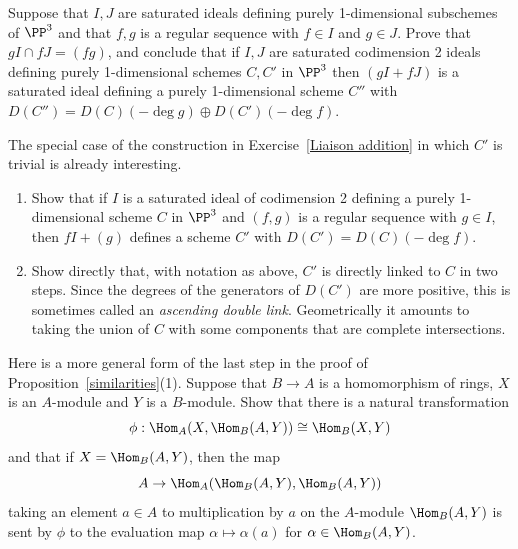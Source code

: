 \begin{exercise}
\label{Liaison addition}
Suppose that $I, J$ are saturated ideals defining purely 1-dimensional
%
subschemes of $\PP^3$
and that $f,g$ is a regular sequence with $f\in I$ and $g\in J$.
Prove that $g I \cap fJ = (fg)$, and conclude that if $I,J$ are saturated
codimension 2 ideals
defining purely 1-dimensional schemes $C,C'$ in $\PP^3$
then $(gI+fJ)$ is a saturated ideal defining a purely 1-dimensional
scheme $C''$ with $D(C'') = D(C)(-\!\deg g) \oplus D(C')(-\!\deg f)$.
\end{exercise}

\begin{exercise}\label{Basic double links}
The special case of the construction in Exercise~\ref{Liaison addition}
%
in which $C'$ is trivial is already interesting.

\begin{enumerate}
\item Show that if $I$ is a 
saturated ideal of codimension 2
%
defining a purely 1-dimensional scheme $C$ in $\PP^3$
and $(f, g)$ is a regular sequence with $g\in I$,
then $fI+(g)$ defines a scheme $C'$ with $D(C') = D(C)(-\!\deg f)$.

\item Show directly that, with notation as above, $C'$ is directly
linked to $C$
in two steps. Since the degrees of the generators of $D(C')$ are more
positive, this
is sometimes called an \emph{ascending double link}. Geometrically it
%
amounts to taking the
union of $C$ with some	components that are 
complete intersections.
%
\end{enumerate}
\end{exercise}

\begin{exercise}
\label{adjointness}
Here is a more general form of the last step in the proof of 
Proposition~\ref{similarities}(1). 
Suppose that $B\to A$ is a homomorphism
of rings, $X$ is an $A$-module and $Y$ is a
$B$-module. Show that there is a natural transformation
$$
\phi: \Hom_A(X, \Hom_B(A, Y)) \cong \Hom_B(X,Y)
$$
and that if $X = \Hom_B(A,Y)$, then the map
$$
A\to \Hom_A(\Hom_B(A,Y), \Hom_B(A, Y))
$$
taking an element $a\in A$ to multiplication by $a$ on the $A$-module
$\Hom_B(A, Y)$
is sent by $\phi$ to the evaluation map $\alpha \mapsto \alpha(a)$ for
$\alpha \in \Hom_B(A,Y)$.
\end{exercise}


